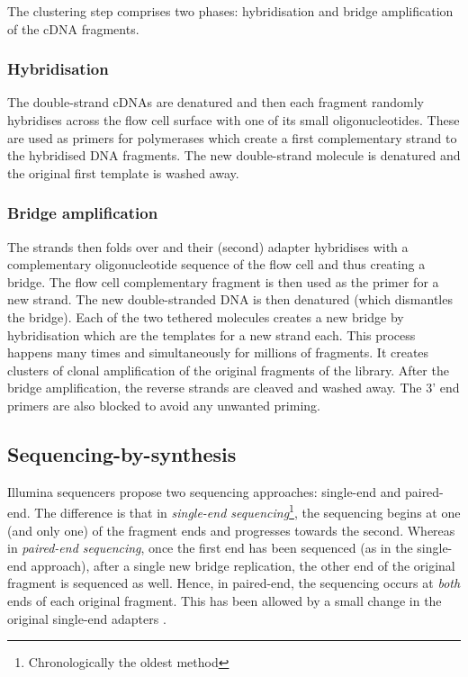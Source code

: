 The clustering step comprises two phases: hybridisation and bridge amplification
of the \gls{cDNA} fragments.

\subsubsection{Hybridisation}

The double-strand \glspl{cDNA} are denatured and then each fragment randomly
hybridises across the flow cell surface with one of its small oligonucleotides.
These are used as primers for polymerases which create a first complementary
strand to the hybridised \gls{DNA} fragments. The new double-strand molecule is
denatured and the original first template is washed away.

\subsubsection{Bridge amplification}
The strands then folds over and their (second) adapter hybridises with a
complementary oligonucleotide sequence of the flow cell and thus creating a
bridge. The flow cell complementary fragment is then used as the primer for a new
strand. The new double-stranded \gls{DNA} is then denatured (which
dismantles the bridge). Each of the two tethered molecules creates a new
bridge by hybridisation which are the templates for a new strand each.
This process happens many times and simultaneously for millions of fragments.
It creates clusters of clonal amplification of the original fragments of
the library. After the bridge amplification, the reverse strands are cleaved
and washed away. The 3' end primers are also blocked to avoid any unwanted
priming.

\subsection{Sequencing-by-synthesis}
\label{subsub:sequencing}

Illumina sequencers propose two sequencing approaches: single-end and paired-end.
The difference is that in \emph{single-end sequencing}\footnote{Chronologically
the oldest method}, the sequencing begins at one (and only one) of the fragment
ends and progresses towards the second. Whereas in \emph{paired-end sequencing},
once the first end has been sequenced (as in the single-end approach), after a
single new bridge replication, the other end of the original fragment is
sequenced as well. Hence, in paired-end, the sequencing occurs at \emph{both}
ends of each original fragment. This has been allowed by a small change in
the original single-end adapters .


